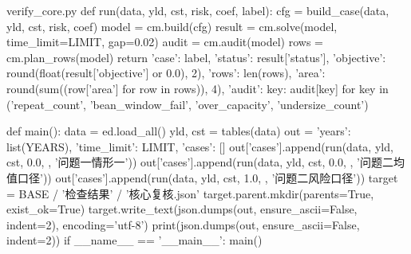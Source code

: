\documentclass[bwprint]{gmcmthesis}
\begin{document}
\begin{appendices}
\begin{Python}{verify\_core.py}
def run(data, yld, cst, risk, coef, label):
    cfg = build_case(data, yld, cst, risk, coef)
    model = cm.build(cfg)
    result = cm.solve(model, time_limit=LIMIT, gap=0.02)
    audit = cm.audit(model)
    rows = cm.plan_rows(model)
    return {'case': label, 'status': result['status'], 'objective': round(float(result['objective'] or 0.0), 2), 'rows': len(rows), 'area': round(sum((row['area'] for row in rows)), 4), 'audit': {key: audit[key] for key in ('repeat_count', 'bean_window_fail', 'over_capacity', 'undersize_count')}}

def main():
    data = ed.load_all()
    yld, cst = tables(data)
    out = {'years': list(YEARS), 'time_limit': LIMIT, 'cases': []}
    out['cases'].append(run(data, yld, cst, 0.0, {}, '问题一情形一'))
    out['cases'].append(run(data, yld, cst, 0.0, {}, '问题二均值口径'))
    out['cases'].append(run(data, yld, cst, 1.0, {}, '问题二风险口径'))
    target = BASE / '检查结果' / '核心复核.json'
    target.parent.mkdir(parents=True, exist_ok=True)
    target.write_text(json.dumps(out, ensure_ascii=False, indent=2), encoding='utf-8')
    print(json.dumps(out, ensure_ascii=False, indent=2))
if __name__ == '__main__':
    main()
\end{Python}


\end{appendices}
\end{document}
